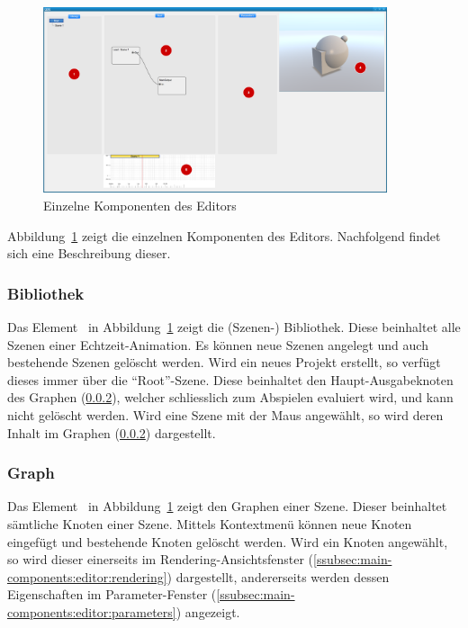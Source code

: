 \begin{figure}[h]
    \centering
    \includegraphics[width=0.9\textwidth]{img/editor_components.png}
    \caption{Einzelne Komponenten des Editors
        \protect\footnotemark}\label{fig:main-components:editor:editor-components}
\end{figure}

Abbildung~\ref{fig:main-components:editor:editor-components} zeigt die
einzelnen Komponenten des Editors. Nachfolgend findet sich eine Beschreibung
dieser.

\subsubsection{Bibliothek}
\label{ssubsec:main-components:editor:library}

Das Element~ in
Abbildung~\ref{fig:main-components:editor:editor-components} zeigt die (Szenen-)
Bibliothek. Diese beinhaltet alle Szenen einer Echtzeit-Animation. Es können
neue Szenen angelegt und auch bestehende Szenen gelöscht werden. Wird ein neues
Projekt erstellt, so verfügt dieses immer über die ``Root''-Szene. Diese
beinhaltet den Haupt-Ausgabeknoten des Graphen
(\ref{ssubsec:main-components:editor:graph}), welcher schliesslich zum
Abspielen evaluiert wird, und kann nicht gelöscht werden. Wird eine Szene mit
der Maus angewählt, so wird deren Inhalt im Graphen
(\ref{ssubsec:main-components:editor:graph}) dargestellt.

\subsubsection{Graph}
\label{ssubsec:main-components:editor:graph}

Das Element~ in
Abbildung~\ref{fig:main-components:editor:editor-components} zeigt den Graphen
einer Szene. Dieser beinhaltet sämtliche Knoten einer Szene. Mittels
Kontextmenü können neue Knoten eingefügt und bestehende Knoten gelöscht werden.
Wird ein Knoten angewählt, so wird dieser einerseits im
Rendering-Ansichtsfenster (\ref{ssubsec:main-components:editor:rendering})
dargestellt, andererseits werden dessen Eigenschaften im Parameter-Fenster
(\ref{ssubsec:main-components:editor:parameters}) angezeigt.

